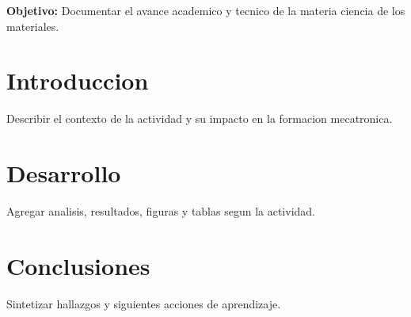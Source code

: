 \documentclass[spanish,letterpaper,oneside]{article}
\begin{document}
\templatePortrait
\templatePagecfg
\onehalfspacing

\begin{abstractd}
\textbf{Objetivo:} Documentar el avance academico y tecnico de la materia ciencia de los materiales.
\end{abstractd}

\templateIndex
\templateFinalcfg

\section{Introduccion}
Describir el contexto de la actividad y su impacto en la formacion mecatronica.

\section{Desarrollo}
Agregar analisis, resultados, figuras y tablas segun la actividad.

\section{Conclusiones}
Sintetizar hallazgos y siguientes acciones de aprendizaje.



\end{document}

